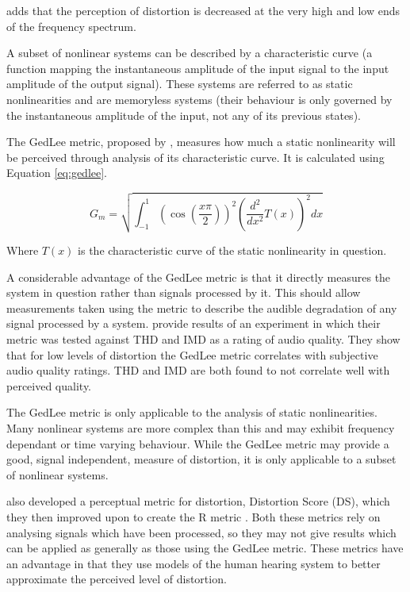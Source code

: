 		\citet{voishvillo2006assessment} adds that the perception of distortion is decreased at the very high and
		low ends of the frequency spectrum.

		A subset of nonlinear systems can be described by a characteristic curve (a function mapping the
		instantaneous amplitude of the input signal to the input amplitude of the output signal). These systems are
		referred to as static nonlinearities and are memoryless systems (their behaviour is only governed by the
		instantaneous amplitude of the input, not any of its previous states).

		The GedLee metric, proposed by \citet{geddes2003auditory}, measures how much a static nonlinearity will be
		perceived through analysis of its characteristic curve. It is calculated using Equation \ref{eq:gedlee}.

		\begin{equation}
			G_{m} = \sqrt{\int_{-1}^{1} \left( \cos \left( \frac{x\pi}{2} \right) \right)^{2}
				      \left( \frac{d^{2}}{dx^{2}} T(x) \right)^{2} dx}
			\label{eq:gedlee}
		\end{equation}

		Where $T(x)$ is the characteristic curve of the static nonlinearity in question.

		A considerable advantage of the GedLee metric is that it directly measures the system in question rather
		than signals processed by it. This should allow measurements taken using the metric to describe the audible
		degradation of any signal processed by a system. \citet{lee2003auditory} provide results of an experiment
		in which their metric was tested against THD and IMD as a rating of audio quality. They show that for low
		levels of distortion the GedLee metric correlates with subjective audio quality ratings. THD and IMD are
		both found to not correlate well with perceived quality.

		The GedLee metric is only applicable to the analysis of static nonlinearities. Many nonlinear systems are
		more complex than this and may exhibit frequency dependant or time varying behaviour.  While the GedLee
		metric may provide a good, signal independent, measure of distortion, it is only applicable to a subset of
		nonlinear systems.

		\citet{tan2003the} also developed a perceptual metric for distortion, Distortion Score (DS), which they then
		improved upon to create the R metric \citep{tan2004predicting}. Both these metrics rely on
		analysing signals which have been processed, so they may not give results which can be applied as generally
		as those using the GedLee metric. These metrics have an advantage in that they use models of the human
		hearing system to better approximate the perceived level of distortion.

